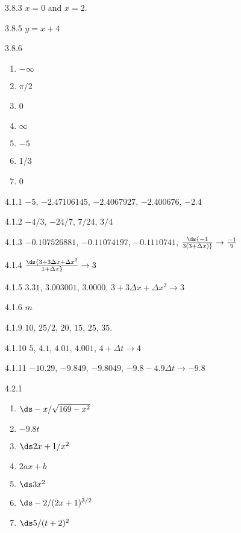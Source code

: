 \begin{Answer}{3.8.3}
	$x=0$ and $x=2$.
\end{Answer}
\begin{Answer}{3.8.5}
	$y=x+4$
\end{Answer}
\begin{Answer}{3.8.6}
		\begin{enumerate}
			\item	$-\infty$
			\item	$\pi/2$
			\item	0
			\item	$\infty$
			\item	$-5$
			\item	1/3
			\item	0
		\end{enumerate}
	
\end{Answer}
\begin{Answer}{4.1.1}
$-5$, $-2.47106145$, $-2.4067927$, $-2.400676$, $-2.4$
\end{Answer}
\begin{Answer}{4.1.2}
$-4/3$, $-24/7$, $7/24$, $3/4$
\end{Answer}
\begin{Answer}{4.1.3}
$-0.107526881$, $-0.11074197$, $-0.1110741$,
$\ds{-1\over3(3+\Delta x)}\rightarrow {-1\over9}$
\end{Answer}
\begin{Answer}{4.1.4}
$\ds{3+3\Delta x+\Delta x^2\over1+\Delta x}\rightarrow3$
\end{Answer}
\begin{Answer}{4.1.5}
$3.31$, $3.003001$, $3.0000$,\hfill\break
 $3+3\Delta x+\Delta x^2\rightarrow3$
\end{Answer}
\begin{Answer}{4.1.6}
$m$
\end{Answer}
\begin{Answer}{4.1.9}
$10$, $25/2$, $20$, $15$, $25$, $35$.
\end{Answer}
\begin{Answer}{4.1.10}
$5$, $4.1$, $4.01$, $4.001$, $4+\Delta t\rightarrow 4$
\end{Answer}
\begin{Answer}{4.1.11}
$-10.29$, $-9.849$, $-9.8049$, \hfill\break
$-9.8-4.9\Delta t\rightarrow -9.8$
\end{Answer}
\begin{Answer}{4.2.1}
\begin{enumerate}
	\item	$\ds -x/\sqrt{169-x^2}$
	\item	$-9.8t$
	\item	$\ds 2x+1/x^2$
	\item	$2ax+b$
	\item	$\ds 3x^2$
	\item	$\ds -2/(2x+1)^{3/2}$
	\item	$\ds 5/(t+2)^2$
\end{enumerate}
\end{Answer}

